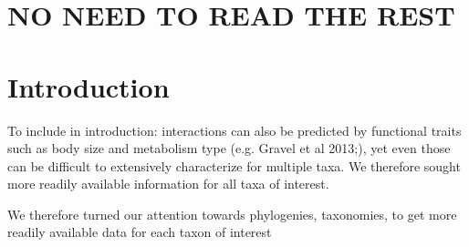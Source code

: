 \documentclass[letterpaper]{article}
\begin{document}
\section{\uppercase {No need to read the rest}}


\section{Introduction}

%
%
%
%
%






To include in introduction: interactions can also be predicted by functional traits such as body size and metabolism type (e.g. Gravel et al 2013;), yet even those can be difficult to extensively characterize for multiple taxa. We therefore sought more readily available information for all taxa of interest.

We therefore turned our attention towards phylogenies, taxonomies, to get more readily available data for each taxon of interest
\end{document}
